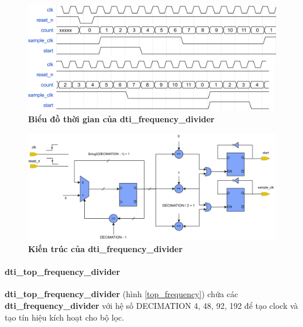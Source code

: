 \begin{figure}[H]
    \centering
    \includegraphics[width=13.5cm]{Images/Chuong4/frequency/frequency_timing.png}
    \caption[Biểu đồ thời gian của dti\_frequency\_divider]{\bfseries \fontsize{12pt}{0pt}\selectfont Biểu đồ thời gian của dti\_frequency\_divider}
    \label{frequency_tt}
\end{figure}



\begin{figure}[H]
    \centering
    \includegraphics[width=15cm]{Images/Chuong4/frequency/frequency_arc.png}
    \caption[Kiến trúc của dti\_frequency\_divider]{\bfseries \fontsize{12pt}{0pt}\selectfont Kiến trúc của dti\_frequency\_divider}
    \label{frequency_a}
\end{figure}

\paragraph{dti\_top\_frequency\_divider}
\textbf{dti\_top\_frequency\_divider} (hình \ref{top_frequency}) chứa các \textbf{dti\_frequency\_divider} với hệ số DECIMATION 4, 48, 92, 192 để tạo clock và tạo tín hiệu kích hoạt cho bộ lọc.

